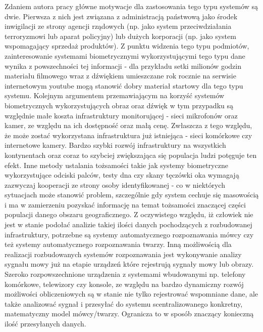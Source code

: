 Zdaniem autora pracy główne motywacje dla zastosowania tego typu systemów są dwie. Pierwsza z nich jest związana z administracją państwową jako środek inwigilacji ze strony agencji rządowych (np. jako system przeciwdziałania terroryzmowi lub aparat policyjny) lub dużych korporacji (np. jako system wspomagający sprzedaż produktów). Z punktu widzenia tego typu podmiotów, zainteresowanie systemami biometrycznymi wykorzystującymi tego typu dane wynika z powszechności tej informacji - dla przykładu setki milionów godzin materiału filmowego wraz z dźwiękiem umieszczane rok rocznie na serwisie internetowym youtube \cite{ystats} mogą stanowić dobry materiał startowy dla tego typu systemu. Kolejnym argumentem przemawiającym na korzyść systemów biometrycznych wykorzystujących obraz oraz dźwięk w tym przypadku są względnie małe koszta infrastruktury monitorującej - sieci mikrofonów oraz kamer, ze względu na ich dostępność oraz małą cenę. Zwłaszcza z tego względu, że może zostać wykorzystana infrastruktura już istniejąca - sieci komórkowe czy internetowe kamery. Bardzo szybki rozwój infrastruktury na wszystkich kontynentach oraz coraz to szybciej zwiększająca się populacja ludzi potęguje ten efekt. Inne metody ustalania tożsamości takie jak systemy biometryczne wykorzystujące odciski palców, testy dna czy skany tęczówki oka wymagają zazwyczaj kooperacji ze strony osoby identyfikowanej - co w niektórych sytuacjach może stanowić problem, szczególnie gdy system cechuje się masowością i ma w zamierzeniu pozyskać informację na temat tożsamości znaczącej części populacji danego obszaru geograficznego. Z oczywistego względu, iż człowiek nie jest w stanie podołać analizie takiej ilości danych pochodzących z rozbudowanej infrastruktury, potrzebne są systemy automatycznego rozpoznawania mówcy czy też systemy automatycznego rozpoznawania twarzy.
Inną możliwością dla realizacji rozbudowanych systemów rozpoznawania jest wykonywanie analizy sygnału mowy już na etapie urządzeń które rejestrują sygnały mowy lub obrazy. Szeroko rozpowszechnione urządzenia z systemami wbudowanymi np. telefony komórkowe, telewizory czy konsole, ze względu na bardzo dynamiczny rozwój możliwości obliczeniowych są w stanie nie tylko rejestrować wspomniane dane, ale także analizować sygnał i przesyłać do systemu scentralizowanego konkretny, matematyczny model mówcy/twarzy. Ogranicza to w sposób znaczący konieczną ilość przesyłanych danych.

